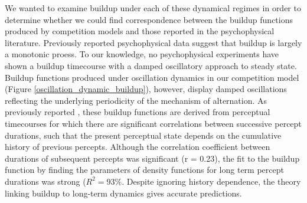 \documentclass{frontiersSCNS} %
\begin{document}
We wanted to examine buildup under each of these dynamical regimes in order to determine whether we could find correspondence between the buildup functions produced by competition models and those reported in the psychophysical literature. Previously reported psychophysical data suggest that buildup is largely a monotonic proess. To our knowledge, no psychophysical experiments have shown a buildup timecourse with a damped oscillatory approach to steady state. Buildup functions produced under oscillation dynamics in our competition model (Figure \ref{oscillation_dynamic_buildup}), however, display damped oscillations reflecting the underlying periodicity of the mechanism of alternation. As previously reported \cite{Shpiro2009}, these buildup functions are derived from perceptual timecourses for which there are significant correlations between successive percept durations, such that the present perceptual state depends on the cumulative history of previous percepts. Although the correlation coefficient between durations of subsequent percepts was significant (r = 0.23), the fit to the buildup function by finding the parameters of density functions for long term percept durations was strong ($R^2 = 93\%$. Despite ignoring history dependence, the theory linking buildup to long-term dynamics gives accurate predictions. 
\end{document}
